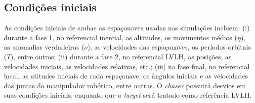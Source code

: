 
\subsection{Condições iniciais}
\label{sec:condicoes_iniciais}
As condições iniciais de ambas as espaçonaves usadas nas simulações incluem:
(i) durante a fase 1, no referencial inercial, as altitudes, os movimentos médios ($\eta$), as anomalias verdadeiras ($\nu$),
as velocidades das espaçonaves, os períodos orbitais ($T$), entre outros;
(ii) durante a fase 2, no referencial LVLH, as posições, as velocidades iniciais, as velocidades relativas, etc.;
(iii) na fase final, no referencial local, as atitudes iniciais de cada espaçonave, os ângulos iniciais e as velocidades das juntas do manipulador robótico, entre outras.
O \emph{chaser} possuirá desvios em suas condições iniciais, enquanto que o \emph{target} será tratado como referência LVLH.